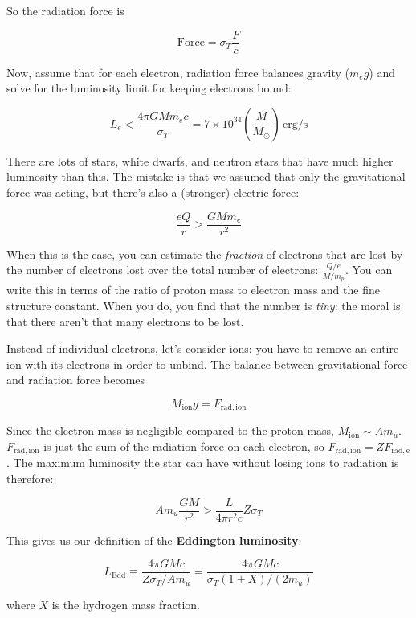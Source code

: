 \documentclass[a4paper]{article}
\newcommand{\ledd}{L_{\mathrm{Edd}}}
\begin{document}
\begin{enumerate}
So the radiation force is

\begin{equation}
\mathrm{Force} = \sigma_T \frac{F}{c}
\end{equation}

Now, assume that for each electron, radiation force balances gravity ($m_e g$) and solve for the luminosity limit for keeping electrons bound:

$$ L_e < \frac{4 \pi G M m_e c}{\sigma_T} = 7 \times 10^{34} \left( \frac{M}{M_\odot} \right) \, \mathrm{erg/s}$$

There are lots of stars, white dwarfs, and neutron stars that have much higher luminosity than this. The mistake is that we assumed that only the gravitational force was acting, but there's also a (stronger) electric force:

$$ \frac{e Q}{r} > \frac{G M m_e} {r^2} $$

When this is the case, you can estimate the \emph{fraction} of electrons that are lost by the number of electrons lost over the total number of electrons: $\frac{Q/e}{M/m_p}$. You can write this in terms of the ratio of proton mass to electron mass and the fine structure constant. When you do, you find that the number is \emph{tiny}: the moral is that there aren't that many electrons to be lost. 

Instead of individual electrons, let's consider ions: you have to remove an entire ion with its electrons in order to unbind. The balance between gravitational force and radiation force becomes

$$ M_{\mathrm{ion}} g = F_{\mathrm{rad, ion}} $$

Since the electron mass is negligible compared to the proton mass, $M_{\mathrm{ion}} \sim A m_u$. $F_{\mathrm{rad, ion}}$ is just the sum of the radiation force on each electron, so $F_{\mathrm{rad, ion}} = Z F_{\mathrm{rad, e}}$. The maximum luminosity the star can have without losing ions to radiation is therefore: 

$$ A m_u \frac{GM}{r^2} > \frac{L}{4 \pi r^2 c} Z \sigma_T $$

This gives us our definition of the \textbf{Eddington luminosity}:

\begin{equation}
\ledd \equiv \frac{4 \pi G M c}{Z \sigma_T / A m_u} = \frac{4 \pi G M c}{\sigma_T (1 + X) / (2 m_u)}
\end{equation}

where $X$ is the hydrogen mass fraction. 


\end{enumerate}
\end{document}

